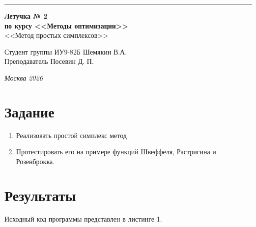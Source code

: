 \documentclass[a4paper, 14pt]{extarticle}
\begin{document}
\begin{titlepage}
\vspace*{-16pt}
\hspace{30pt}\rule{0.866\textwidth}{0.4pt}
  
\vspace{11em}

\begin{center}
\Large {\bf Летучка № 2} \\ 
\large {\bf по курсу <<Методы оптимизации>>} \\
\large <<Метод простых симплексов>> 
\end{center}\normalsize

\vspace{8em}


\begin{flushright}
  {Студент группы ИУ9-82Б Шемякин В.А. \hspace*{15pt}\\ 
  \vspace{2ex}
  Преподаватель Посевин Д. П.\hspace*{15pt}}
\end{flushright}

\bigskip

\vfill
 

\begin{center}
\textsl{Москва 2026}
\end{center}
\end{titlepage}

\renewcommand{\ttdefault}{pcr}

\setlength{\tabcolsep}{3pt}
\newpage
\setcounter{page}{2}

\section{Задание}\label{Sect::task}
\begin{enumerate}
\item Реализовать простой симплекс метод
\item Протестировать его на примере функций Швеффеля, Растригина и Розенброкка.
\end{enumerate}

\section{Результаты}\label{Sect::res}

Исходный код программы представлен в листинге 1.
\end{document}
